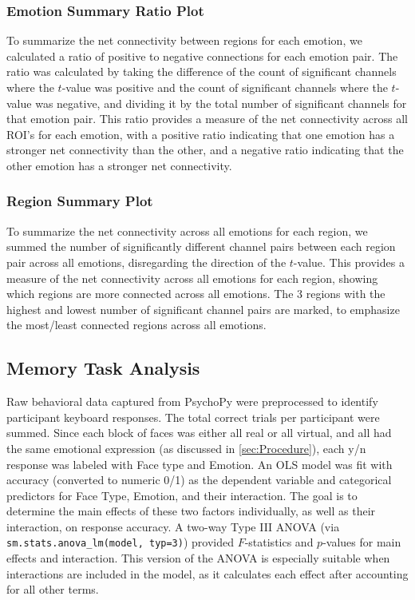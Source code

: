 \subsubsection{Emotion Summary Ratio Plot}
To summarize the net connectivity between regions for each emotion, we calculated a ratio of positive to negative connections for each emotion pair.
The ratio was calculated by taking the difference of the count of significant channels where the $t$-value was positive and the count of significant channels where the $t$-value was negative, and dividing it by the total number of significant channels for that emotion pair. 
This ratio provides a measure of the net connectivity across all ROI's for each emotion, with a positive ratio indicating that one emotion has a stronger net connectivity than the other, and a negative ratio indicating that the other emotion has a stronger net connectivity.

\subsubsection{Region Summary Plot}
To summarize the net connectivity across all emotions for each region, we summed the number of significantly different channel pairs between each region pair across all emotions, disregarding the direction of the $t$-value.
This provides a measure of the net connectivity across all emotions for each region, showing which regions are more connected across all emotions.
The 3 regions with the highest and lowest number of significant channel pairs are marked, to emphasize the most/least connected regions across all emotions.

\subsection{Memory Task Analysis}
\label{sec:memory_task_analysis}
Raw behavioral data captured from PsychoPy were preprocessed to identify participant keyboard responses. 
The total correct trials per participant were summed. 
Since each block of faces was either all real or all virtual, and all had the same emotional expression (as discussed in \ref{sec:Procedure}), each y/n response was labeled with Face type and Emotion.
An OLS model was fit with accuracy (converted to numeric 0/1) as the dependent variable and categorical predictors for Face Type, Emotion, and their interaction. 
The goal is to determine the main effects of these two factors individually, as well as their interaction, on response accuracy.
A two-way Type III ANOVA (via \texttt{sm.stats.anova\_lm(model, typ=3)}) provided $F$-statistics and $p$-values for main effects and interaction.
This version of the ANOVA is especially suitable when interactions are included in the model, as it calculates each effect after accounting for all other terms.